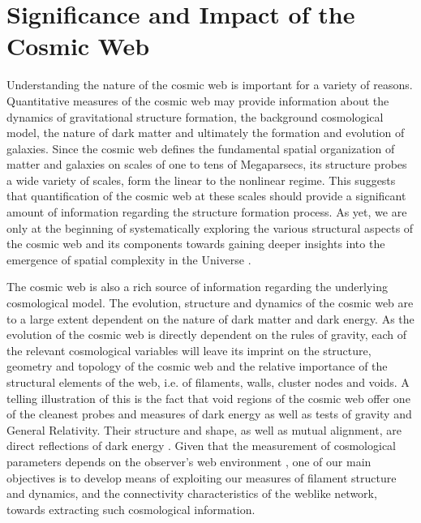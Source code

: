 \section{Significance and Impact of the Cosmic Web}
Understanding the nature of the cosmic web is important for a variety of reasons. Quantitative measures of the cosmic web 
may provide information about the dynamics of gravitational structure formation, the background cosmological model, the 
nature of dark matter and ultimately the formation and evolution of galaxies. Since the cosmic web defines the fundamental spatial organization of matter and galaxies on scales of one to tens of Megaparsecs, its structure probes a wide variety of scales, form the linear to the nonlinear regime. This suggests that quantification of the cosmic web at these scales should provide a significant amount of 
information regarding the structure formation process. As yet, we are only at the beginning of systematically exploring the various 
structural aspects of the cosmic web and its components towards gaining deeper insights into the emergence of spatial 
complexity in the Universe \citep[see e.g.][]{Cautun2014a}. 

The cosmic web is also a rich source of information regarding the underlying cosmological model. The evolution, structure and dynamics of the 
cosmic web are to a large extent dependent on the nature of dark matter and dark energy. As the evolution of the cosmic web 
is directly dependent on the rules of gravity, each of the relevant cosmological variables will leave its imprint on the 
structure, geometry and topology of the cosmic web and the relative importance of the structural elements of the 
web, i.e. of filaments, walls, cluster nodes and voids. A telling illustration of this is the fact that  void regions of the cosmic web offer one of the cleanest probes and measures of dark energy as well as tests of gravity and General Relativity. Their structure and shape, as well as mutual alignment, are direct 
reflections of dark energy \citep{Park2007,Platen2008a,Lavaux2010,Lavaux2012,Bos2012,Sutter2014a,Pisani2015}. Given that the measurement of cosmological parameters depends on the observer's web environment \citep[e.g.][]{Wojtak2014}, one of our 
main objectives is to develop means of exploiting our measures of filament structure and dynamics, and the connectivity 
characteristics of the weblike network, towards extracting such cosmological information. 


